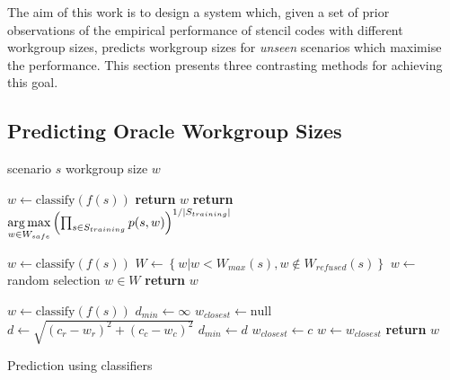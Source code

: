 \documentclass[preprint,nonatbib,10pt]{sigplanconf}
\begin{document}
The aim of this work is to design a system which, given a set of prior
observations of the empirical performance of stencil codes with
different workgroup sizes, predicts workgroup sizes for \emph{unseen}
scenarios which maximise the performance. This section presents three
contrasting methods for achieving this goal.


\subsection{Predicting Oracle Workgroup Sizes}

\begin{algorithm}[t]
\begin{algorithmic}[1]
\Require scenario $s$
\Ensure workgroup size $w$

\State $w \leftarrow \text{classify}(f(s))$
    \State \textbf{return} $w$
\Else
  \State \textbf{return} $\underset{w \in W_{safe}}{\operatorname*{arg\,max}}
\left(
  \prod_{s \in S_{training}} p(s, w)
\right)^{1/|S_{training}|}$
\EndIf
\EndProcedure
\item[] %

\State $w \leftarrow \text{classify}(f(s))$
  \State $W \leftarrow \left\{ w | w < W_{max}(s), w \not\in W_{refused}(s) \right\}$
  \State $w \leftarrow $ random selection $w \in W$
\EndWhile
\State \textbf{return} $w$
\EndProcedure
\item[] %

\State $w \leftarrow \text{classify}(f(s))$
  \State $d_{min} \leftarrow \infty$
  \State $w_{closest} \leftarrow \text{null}$
    \State $d \leftarrow \sqrt{\left(c_r - w_r\right)^2 + \left(c_c - w_c\right)^2}$
      \State $d_{min} \leftarrow d$
      \State $w_{closest} \leftarrow c$
    \EndIf
  \EndFor
  \State $w \leftarrow w_{closest}$
\EndWhile
\State \textbf{return} $w$
\EndProcedure
\end{algorithmic}
\caption{Prediction using classifiers}
\label{alg:autotune-classification}
\end{algorithm}
\end{document}
